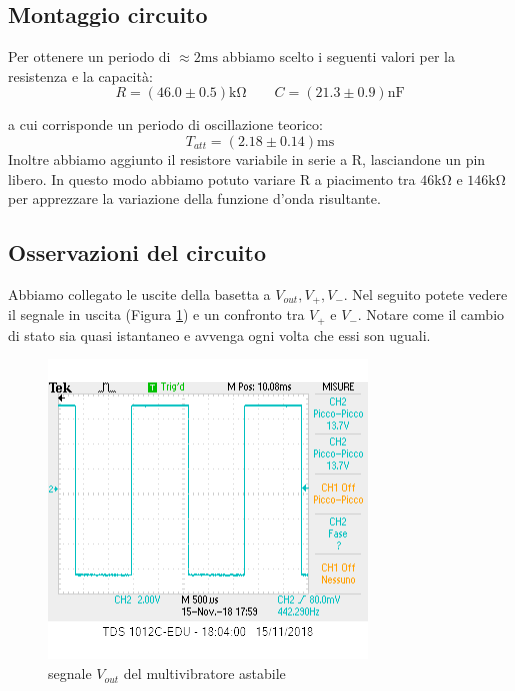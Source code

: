 \documentclass[10pt,a4paper]{article}
\begin{document}
\subsection{Montaggio circuito}
Per ottenere un periodo di $\approx 2 \si{\milli\second}$ abbiamo scelto i seguenti valori per la resistenza e la capacità:
\[ R = ( 46.0 \pm0.5 )\si{\kilo\ohm} \qquad   C = (21.3\pm0.9 )\si{\nano \farad}\]

a cui corrisponde un periodo di oscillazione teorico:
\[T_{att}= (2.18\pm 0.14 )\si{\milli \second}\]
Inoltre abbiamo aggiunto il resistore variabile in serie a R, lasciandone un pin libero. In questo modo abbiamo potuto variare R a piacimento tra $46 \si{\kilo\ohm}$ e $146 \si{\kilo\ohm}$ per apprezzare la variazione della funzione d'onda risultante.


\subsection{Osservazioni del circuito}
Abbiamo collegato le uscite della basetta a $V_{out}, V_{+}, V_{-}$. Nel seguito potete vedere il segnale in uscita (Figura \ref{fig:V_out}) e un confronto tra $V_{+}$ e $V_{-}$. Notare come il cambio di stato sia quasi istantaneo e avvenga ogni volta che essi son uguali.
 
 \begin{figure}[h]
 	\centering
 		\includegraphics[scale=0.8]{vout_punto2.png}
 		\caption{\small segnale $V_{out}$ del multivibratore astabile }
 		\label{fig:V_out}
 \end{figure}
 
\end{document}

